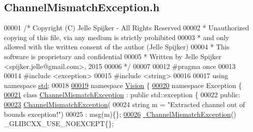 \hypertarget{_channel_mismatch_exception_8h_source}{}\subsection{Channel\+Mismatch\+Exception.\+h}
\label{_channel_mismatch_exception_8h_source}

\begin{DoxyCode}
00001 \textcolor{comment}{/* Copyright (C) Jelle Spijker - All Rights Reserved}
00002 \textcolor{comment}{ * Unauthorized copying of this file, via any medium is strictly prohibited}
00003 \textcolor{comment}{ * and only allowed with the written consent of the author (Jelle Spijker)}
00004 \textcolor{comment}{ * This software is proprietary and confidential}
00005 \textcolor{comment}{ * Written by Jelle Spijker <spijker.jelle@gmail.com>, 2015}
00006 \textcolor{comment}{ */}
00007 
00012 \textcolor{preprocessor}{#pragma once}
00013 
00014 \textcolor{preprocessor}{#include <exception>}
00015 \textcolor{preprocessor}{#include <string>}
00016 
00017 \textcolor{keyword}{using namespace }\hyperlink{namespacestd}{std};
00018 
\hypertarget{_channel_mismatch_exception_8h_source_l00019}{}\hyperlink{namespace_vision}{00019} \textcolor{keyword}{namespace }\hyperlink{namespace_vision}{Vision} \{
\hypertarget{_channel_mismatch_exception_8h_source_l00020}{}\hyperlink{namespace_vision_1_1_exception}{00020} \textcolor{keyword}{namespace }Exception \{
\hypertarget{_channel_mismatch_exception_8h_source_l00021}{}\hyperlink{class_vision_1_1_exception_1_1_channel_mismatch_exception}{00021} \textcolor{keyword}{class }\hyperlink{class_vision_1_1_exception_1_1_channel_mismatch_exception}{ChannelMismatchException} : \textcolor{keyword}{public} std::exception \{
00022 \textcolor{keyword}{public}:
\hypertarget{_channel_mismatch_exception_8h_source_l00023}{}\hyperlink{class_vision_1_1_exception_1_1_channel_mismatch_exception_a6fcbebd5e804c5b76b24506fe558d656}{00023}   \hyperlink{class_vision_1_1_exception_1_1_channel_mismatch_exception_a6fcbebd5e804c5b76b24506fe558d656}{ChannelMismatchException}(
00024       \textcolor{keywordtype}{string} m = \textcolor{stringliteral}{"Extracted channel out of bounds exception!"})
00025       : msg(m)\{\};
\hypertarget{_channel_mismatch_exception_8h_source_l00026}{}\hyperlink{class_vision_1_1_exception_1_1_channel_mismatch_exception_abef15b64f935832cc516696b68f6a012}{00026}   \hyperlink{class_vision_1_1_exception_1_1_channel_mismatch_exception_abef15b64f935832cc516696b68f6a012}{~ChannelMismatchException}() \_GLIBCXX\_USE\_NOEXCEPT\{\};

\end{DoxyCode}
